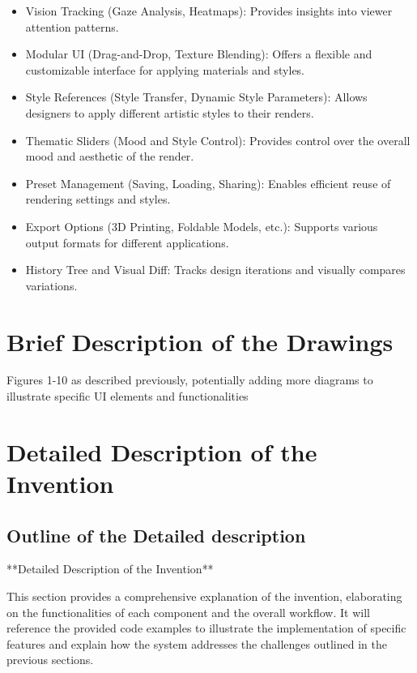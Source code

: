 \documentclass{article}
\begin{document}
\begin{itemize}
    \item Vision Tracking (Gaze Analysis, Heatmaps): Provides insights into viewer attention patterns.

    \item Modular UI (Drag-and-Drop, Texture Blending): Offers a flexible and customizable interface for applying materials and styles.

    \item  Style References (Style Transfer, Dynamic Style Parameters): Allows designers to apply different artistic styles to their renders.

    \item Thematic Sliders (Mood and Style Control): Provides control over the overall mood and aesthetic of the render.

    \item Preset Management (Saving, Loading, Sharing): Enables efficient reuse of rendering settings and styles.

    \item Export Options (3D Printing, Foldable Models, etc.): Supports various output formats for different applications.

    \item History Tree and Visual Diff: Tracks design iterations and visually compares variations.

\end{itemize}

\section{Brief Description of the Drawings}

Figures 1-10 as described previously, potentially adding more diagrams to illustrate specific UI elements and functionalities


\section{Detailed Description of the Invention}

\subsection{Outline of the Detailed description}
**Detailed Description of the Invention**

This section provides a comprehensive explanation of the invention, elaborating on the functionalities of each component and the overall workflow.  It will reference the provided code examples to illustrate the implementation of specific features and explain how the system addresses the challenges outlined in the previous sections.
\end{document}
